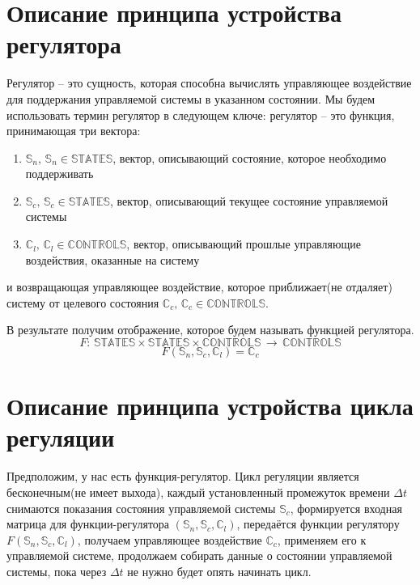 \documentclass[14pt]{extreport}
\begin{document}
        \section{Описание принципа устройства регулятора}
            Регулятор -- это сущность, которая способна вычислять управляющее воздействие для поддержания управляемой системы в указанном состоянии.
            Мы будем использовать термин регулятор в следующем ключе: регулятор -- это функция, принимающая три вектора:
            {
                \begin{enumerate}
                      \item \(\mathbb{S}_n,\, \mathbb{S}_n \in \mathbb{STATES}\),
                        вектор, описывающий состояние, которое необходимо поддерживать
                      \item \(\mathbb{S}_c,\, \mathbb{S}_c \in \mathbb{STATES}\),
                        вектор, описывающий текущее состояние управляемой системы
                      \item \(\mathbb{C}_l,\, \mathbb{C}_l \in \mathbb{CONTROLS}\),
                        вектор, описывающий прошлые управляющие воздействия, оказанные на систему
                \end{enumerate}
            }
            и возвращающая управляющее воздействие, которое приближает(не отдаляет) систему от целевого состояния \(\mathbb{C}_c,\, \mathbb{C}_c \in \mathbb{CONTROLS}\).

            В результате получим отображение, которое будем называть функцией регулятора.
            \[F:\,\mathbb{STATES}\times\mathbb{STATES}\times\mathbb{CONTROLS}\,\rightarrow\,\mathbb{CONTROLS}\]
            \[F(\mathbb{S}_n,\mathbb{S}_c,\mathbb{C}_l) = \mathbb{C}_c\]

        \section{Описание принципа устройства цикла регуляции}
            Предположим, у нас есть функция-регулятор. Цикл регуляции является бесконечным(не имеет выхода), каждый установленный промежуток времени $\Delta t$ снимаются показания состояния управляемой системы $\mathbb{S}_c$, формируется входная матрица для функции-регулятора $(\mathbb{S}_n,\mathbb{S}_c,\mathbb{C}_l)$, передаётся функции регулятору $F(\mathbb{S}_n,\mathbb{S}_c,\mathbb{C}_l)$, получаем управляющее воздействие $ \mathbb{C}_c$, применяем его к управляемой системе, продолжаем собирать данные о состоянии управляемой системы, пока через $\Delta t$ не нужно будет опять начинать цикл.
\end{document}
